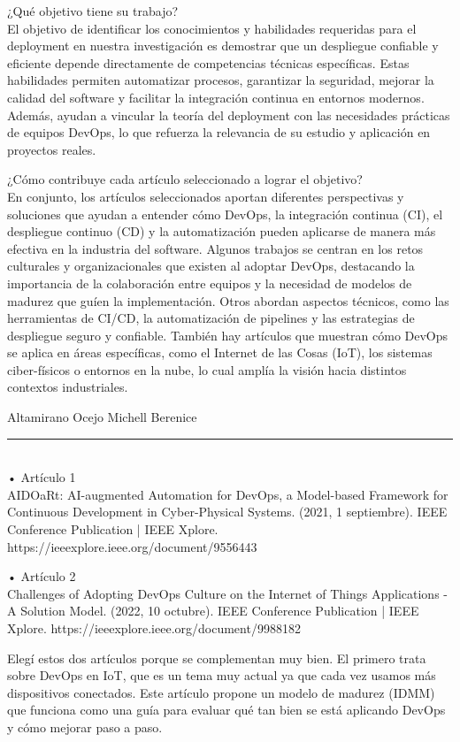 \documentclass[12pt,a4paper]{article}
\begin{document}
¿Qué objetivo tiene su trabajo? \\
El objetivo de identificar los conocimientos y habilidades requeridas para el deployment en nuestra investigación es demostrar que un despliegue confiable y eficiente depende directamente de competencias técnicas específicas. Estas habilidades permiten automatizar procesos, garantizar la seguridad, mejorar la calidad del software y facilitar la integración continua en entornos modernos. Además, ayudan a vincular la teoría del deployment con las necesidades prácticas de equipos DevOps, lo que refuerza la relevancia de su estudio y aplicación en proyectos reales.

¿Cómo contribuye cada artículo seleccionado a lograr el objetivo? \\
En conjunto, los artículos seleccionados aportan diferentes perspectivas y soluciones que ayudan a entender cómo DevOps, la integración continua (CI), el despliegue continuo (CD) y la automatización pueden aplicarse de manera más efectiva en la industria del software.
Algunos trabajos se centran en los retos culturales y organizacionales que existen al adoptar DevOps, destacando la importancia de la colaboración entre equipos y la necesidad de modelos de madurez que guíen la implementación. Otros abordan aspectos técnicos, como las herramientas de CI/CD, la automatización de pipelines y las estrategias de despliegue seguro y confiable. También hay artículos que muestran cómo DevOps se aplica en áreas específicas, como el Internet de las Cosas (IoT), los sistemas ciber-físicos o entornos en la nube, lo cual amplía la visión hacia distintos contextos industriales.

\newpage
Altamirano Ocejo Michell Berenice \\
\rule{\linewidth}{0.3mm} \\
• Artículo 1 \\
AIDOaRt: AI-augmented Automation for DevOps, a Model-based Framework for Continuous Development in Cyber-Physical Systems. (2021, 1 septiembre). IEEE Conference Publication | IEEE Xplore. https://ieeexplore.ieee.org/document/9556443

• Artículo 2 \\
Challenges of Adopting DevOps Culture on the Internet of Things Applications - A Solution Model. (2022, 10 octubre). IEEE Conference Publication | IEEE Xplore. https://ieeexplore.ieee.org/document/9988182


Elegí estos dos artículos porque se complementan muy bien. El primero trata sobre DevOps en IoT, que es un tema muy actual ya que cada vez usamos más dispositivos conectados. Este artículo propone un modelo de madurez (IDMM) que funciona como una guía para evaluar qué tan bien se está aplicando DevOps y cómo mejorar paso a paso.
\end{document}
